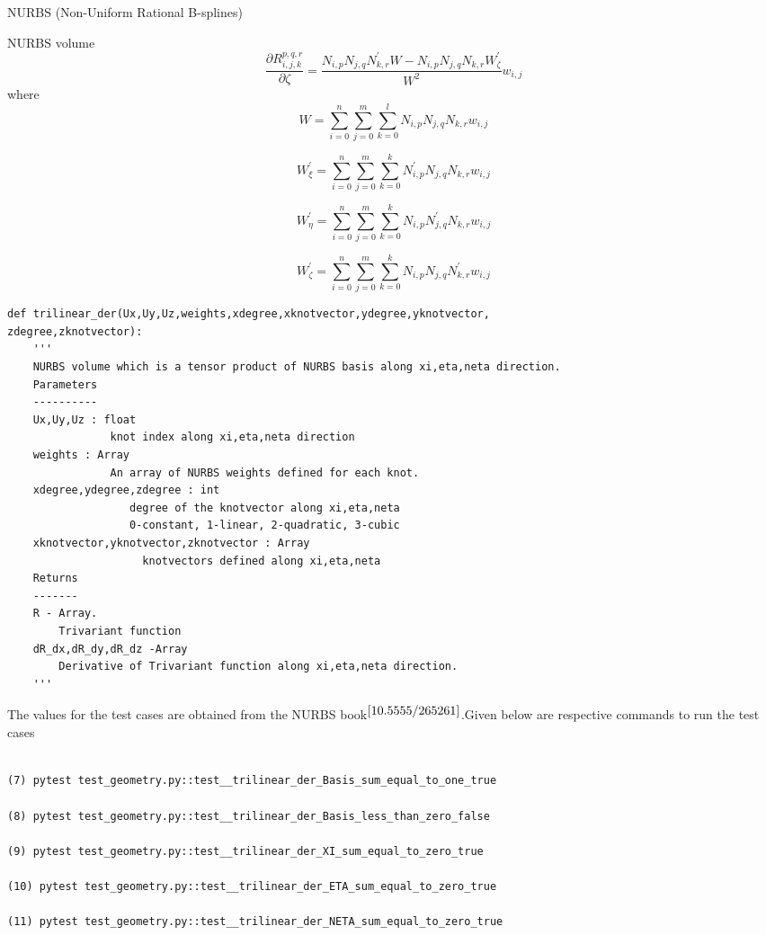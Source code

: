 \documentclass[a4paper,12pt,times]{article}
\begin{document}
\begin{section}{NURBS (Non-Uniform Rational B-splines) }
\begin{subsection}{NURBS volume}
\begin{equation}
\frac{\partial R_{i, j,k}^{p, q,r}}{\partial \zeta}=\frac{N_{i, p} N_{j, q}N_{k, r}^{\prime} W-N_{i, p} N_{j, q} N_{k, r}W_{\zeta}^{\prime}}{W^{2}} w_{i, j}
\end{equation}
where
\begin{equation}
W=\sum_{i=0}^{n} \sum_{j=0}^{m}\sum_{k=0}^{l} N_{i, p} N_{j, q} N_{k, r}w_{i, j}
\end{equation}

\begin{equation}
W_{\xi}^{\prime}=\sum_{i=0}^{n} \sum_{j=0}^{m} \sum_{k=0}^{k} N_{i, p}^{\prime} N_{j, q} N_{k, r} w_{i, j}
\end{equation}

\begin{equation}
W_{\eta}^{\prime}=\sum_{i=0}^{n} \sum_{j=0}^{m} \sum_{k=0}^{k} N_{i, p} N_{j, q}^{\prime} N_{k, r} w_{i, j}
\end{equation}

\begin{equation}
W_{\zeta}^{\prime}=\sum_{i=0}^{n} \sum_{j=0}^{m} \sum_{k=0}^{k} N_{i, p} N_{j, q} N_{k, r}^{\prime} w_{i, j}
\end{equation}
\end{subsection}
\begin{lstlisting}
def trilinear_der(Ux,Uy,Uz,weights,xdegree,xknotvector,ydegree,yknotvector,
zdegree,zknotvector):
    '''
    NURBS volume which is a tensor product of NURBS basis along xi,eta,neta direction.
    Parameters
    ----------
    Ux,Uy,Uz : float
                knot index along xi,eta,neta direction
    weights : Array 
                An array of NURBS weights defined for each knot.
    xdegree,ydegree,zdegree : int
                   degree of the knotvector along xi,eta,neta
                   0-constant, 1-linear, 2-quadratic, 3-cubic
    xknotvector,yknotvector,zknotvector : Array
                     knotvectors defined along xi,eta,neta
    Returns
    -------
    R - Array.
        Trivariant function 
    dR_dx,dR_dy,dR_dz -Array
        Derivative of Trivariant function along xi,eta,neta direction.
    '''
\end{lstlisting}
The values for the test cases are obtained from the NURBS book$^{\cite{10.5555/265261}}$.Given below are respective commands to run the test cases
\begin{lstlisting}

(7) pytest test_geometry.py::test__trilinear_der_Basis_sum_equal_to_one_true

(8) pytest test_geometry.py::test__trilinear_der_Basis_less_than_zero_false

(9) pytest test_geometry.py::test__trilinear_der_XI_sum_equal_to_zero_true

(10) pytest test_geometry.py::test__trilinear_der_ETA_sum_equal_to_zero_true

(11) pytest test_geometry.py::test__trilinear_der_NETA_sum_equal_to_zero_true

\end{lstlisting}
\end{section}
\end{document}
